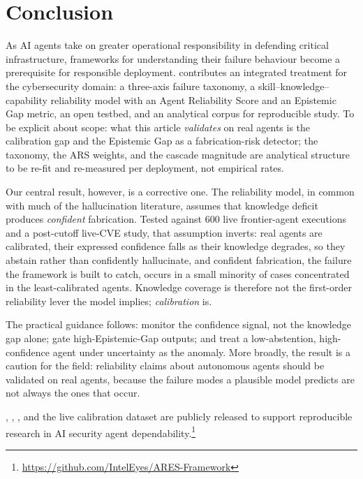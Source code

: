 \section{Conclusion}
\label{sec:conclusion}

As AI agents take on greater operational responsibility in defending
critical infrastructure, frameworks for understanding their failure
behaviour become a prerequisite for responsible deployment. \ARES{}
contributes an integrated treatment for the cybersecurity domain: a
three-axis failure taxonomy, a skill--knowledge--capability reliability
model with an Agent Reliability Score and an Epistemic Gap metric, an
open testbed, and an analytical corpus for reproducible study. To be
explicit about scope: what this article \emph{validates} on real agents
is the calibration gap and the Epistemic Gap as a fabrication-risk
detector; the taxonomy, the ARS weights, and the cascade magnitude are
analytical structure to be re-fit and re-measured per deployment, not
empirical rates.

Our central result, however, is a corrective one. The reliability
model, in common with much of the hallucination literature, assumes
that knowledge deficit produces \textit{confident} fabrication. Tested
against 600 live frontier-agent executions and a post-cutoff live-CVE
study, that assumption inverts: real agents are calibrated, their
expressed confidence falls as their knowledge degrades, so they abstain
rather than confidently hallucinate, and confident fabrication, the
failure the framework is built to catch, occurs in a small minority of
cases concentrated in the least-calibrated agents. Knowledge coverage
is therefore not the first-order reliability lever the model implies;
\textit{calibration} is.

The practical guidance follows: monitor the confidence signal, not the
knowledge gap alone; gate high-Epistemic-Gap outputs; and treat a
low-abstention, high-confidence agent under uncertainty as the anomaly.
More broadly, the result is a caution for the field: reliability claims
about autonomous agents should be validated on real agents, because the
failure modes a plausible model predicts are not always the ones that
occur.

\ARES{}, \ARESBench{}, \SAFK{}, and the live calibration dataset are
publicly released to support reproducible research in AI security agent
dependability.\footnote{\url{https://github.com/IntelEyes/ARES-Framework}}
